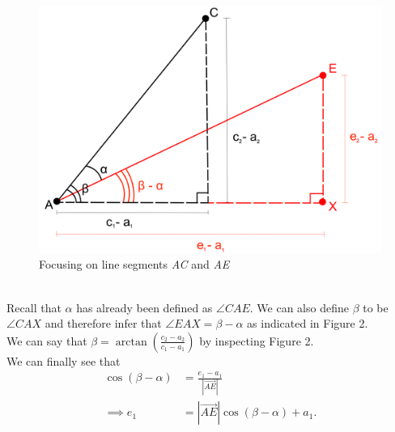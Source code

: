 \documentclass{article}
\begin{document}
\begin{figure}[h]
	\centering	
	\includegraphics[scale=0.08]{Images/DragFunction2.png}
	\caption{Focusing on line segments \emph{AC} and \emph{AE}}
\end{figure} \vspace{\baselineskip}\\
Recall that $\alpha$ has already been defined as $\angle CAE$. We can also define $\beta$ to be $\angle CAX$ and therefore infer that $\angle EAX = \beta - \alpha$ as indicated in Figure 2.\vspace{\baselineskip}\\
We can say that $\beta = \arctan{\left(\frac{c_2 - a_2}{c_1 - a_1}\right)}$ by inspecting Figure 2. \vspace{\baselineskip}\\
We can finally see that	
\begin{align*}
\cos{(\beta - \alpha)} &= \frac{e_1 - a_1}{|\overrightarrow{AE}|}\\
\implies e_1 &= |\overrightarrow{AE}| \cos{(\beta - \alpha)} + a_1.
\end{align*}
\end{document}
